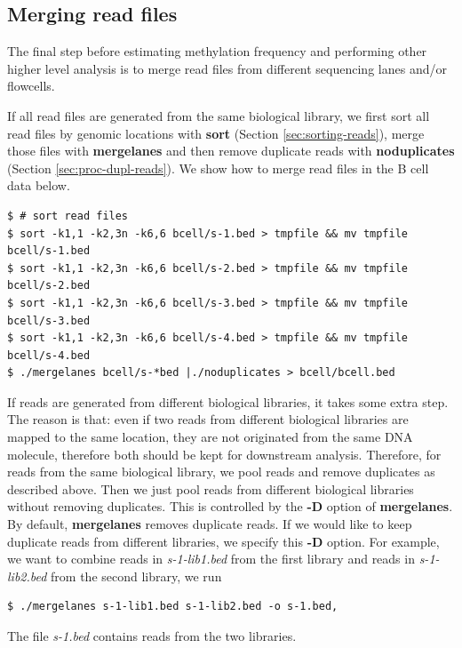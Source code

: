 \documentclass{article}
\begin{document}
\subsection{Merging read files}
\label{sec:merging-reads-files}
The final step before estimating methylation frequency and performing
other higher level analysis is to merge read files from different
sequencing lanes and/or flowcells. 

If all read files are generated from the same biological library, we
first sort all read files by genomic locations with \textbf{sort}
(Section \ref{sec:sorting-reads}), merge those files with
\textbf{mergelanes} and then remove duplicate reads with
\textbf{noduplicates} (Section \ref{sec:proc-dupl-reads}). We show how
to merge read files in the B cell data below.
\begin{verbatim}
$ # sort read files
$ sort -k1,1 -k2,3n -k6,6 bcell/s-1.bed > tmpfile && mv tmpfile bcell/s-1.bed
$ sort -k1,1 -k2,3n -k6,6 bcell/s-2.bed > tmpfile && mv tmpfile bcell/s-2.bed
$ sort -k1,1 -k2,3n -k6,6 bcell/s-3.bed > tmpfile && mv tmpfile bcell/s-3.bed
$ sort -k1,1 -k2,3n -k6,6 bcell/s-4.bed > tmpfile && mv tmpfile bcell/s-4.bed
$ ./mergelanes bcell/s-*bed |./noduplicates > bcell/bcell.bed 
\end{verbatim}

If reads are generated from different biological libraries, it takes
some extra step. The reason is that: even if two reads from different
biological libraries are mapped to the same location, they are not
originated from the same DNA molecule, therefore both should be kept
for downstream analysis. Therefore, for reads from the same biological
library, we pool reads and remove duplicates as described above. Then
we just pool reads from different biological libraries without
removing duplicates. This is controlled by the \textbf{-D} option of
\textbf{mergelanes}. By default, \textbf{mergelanes} removes duplicate
reads. If we would like to keep duplicate reads from different
libraries, we specify this \textbf{-D} option. For example, we want to
combine reads in \textit{s-1-lib1.bed} from the first library and
reads in \textit{s-1-lib2.bed} from the second library, we run
\begin{verbatim}
$ ./mergelanes s-1-lib1.bed s-1-lib2.bed -o s-1.bed,  
\end{verbatim}
The file \textit{s-1.bed} contains reads from the two libraries. 
\end{document}
